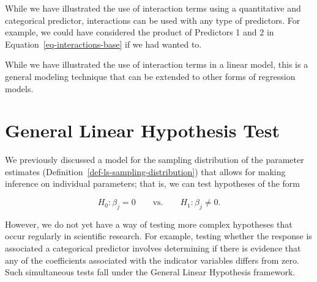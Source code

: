 \documentclass[
  letterpaper,
  DIV=11,
  numbers=noendperiod]{scrreprt}
\theoremstyle{definition}
\theoremstyle{definition}
\theoremstyle{remark}
\begin{document}
\begin{tcolorbox}[enhanced jigsaw, left=2mm, toprule=.15mm, arc=.35mm, breakable, opacitybacktitle=0.6, opacityback=0, rightrule=.15mm, colbacktitle=quarto-callout-note-color!10!white, coltitle=black, leftrule=.75mm, toptitle=1mm, colframe=quarto-callout-note-color-frame, titlerule=0mm, title=\textcolor{quarto-callout-note-color}{\faInfo}\hspace{0.5em}{Note}, bottomrule=.15mm, colback=white, bottomtitle=1mm]

While we have illustrated the use of interaction terms using a
quantitative and categorical predictor, interactions can be used with
any type of predictors. For example, we could have considered the
product of Predictors 1 and 2 in Equation~\ref{eq-interactions-base} if
we had wanted to.

\end{tcolorbox}

While we have illustrated the use of interaction terms in a linear
model, this is a general modeling technique that can be extended to
other forms of regression models.

\hypertarget{sec-modeling-linear-hypotheses}{%
\chapter{General Linear Hypothesis
Test}\label{sec-modeling-linear-hypotheses}}

\providecommand{\norm}[1]{\left\lVert#1\right\rVert}
\providecommand{\abs}[1]{\left\lvert#1\right\rvert}
\providecommand{\dist}[1]{\stackrel{\text{#1}}{\sim}}
\providecommand{\ind}[1]{\mathbb{I}\left(#1\right)}
\providecommand{\bm}[1]{\mathbf{#1}}
\providecommand{\bs}[1]{\boldsymbol{#1}}
\providecommand{\Ell}{\mathcal{L}}
\providecommand{\indep}{\perp\negthickspace\negmedspace\perp}

We previously discussed a model for the sampling distribution of the
parameter estimates (Definition~\ref{def-ls-sampling-distribution}) that
allows for making inference on individual parameters; that is, we can
test hypotheses of the form

\[H_0: \beta_j = 0 \qquad \text{vs.} \qquad H_1: \beta_j \neq 0.\]

However, we do not yet have a way of testing more complex hypotheses
that occur regularly in scientific research. For example, testing
whether the response is associated a categorical predictor involves
determining if there is evidence that any of the coefficients associated
with the indicator variables differs from zero. Such simultaneous tests
fall under the General Linear Hypothesis framework.
\end{document}
